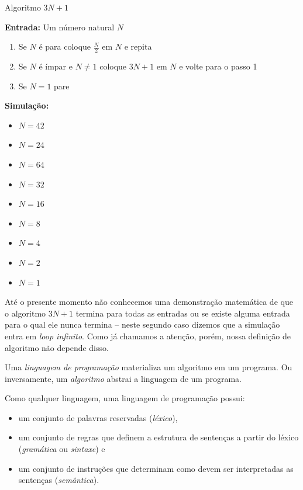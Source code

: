 \begin{example}{Algoritmo $3N+1$}
  \label{ex:euclides}

  \noindent
  {\bf Entrada:} Um número natural $N$
  \begin{enumerate}
  \item Se $N$ é para coloque $\frac{N}{2}$ em $N$ e repita
  \item Se $N$ é ímpar e $N \neq 1$ coloque $3N+1$ em $N$ e volte para o passo 1
  \item Se $N = 1$ pare
  \end{enumerate}

  \noindent
  {\bf Simulação:}
  \begin{itemize}
  \item $N = 42$
  \item $N = 24$
  \item $N = 64$
  \item $N = 32$
  \item $N = 16$
  \item $N = 8$
  \item $N = 4$
  \item $N = 2$
  \item $N = 1$
  \end{itemize}
\end{example}

Até o presente momento não conhecemos uma demonstração matemática de que o algoritmo $3N+1$ termina para todas as entradas ou se existe alguma entrada para o qual ele nunca termina -- neste segundo caso dizemos que a simulação entra em {\em loop infinito}.
Como já chamamos a atenção, porém, nossa definição de algoritmo não depende disso.

Uma {\em linguagem de programação} materializa um algoritmo em um programa.
Ou inversamente, um {\em algoritmo} abstrai a linguagem de um programa.

\begin{center}
\end{center}

Como qualquer linguagem, uma linguagem de programação possui:
\begin{itemize}
\item um conjunto de palavras reservadas ({\em léxico}), 
\item um conjunto de regras que definem a estrutura de sentenças a partir do léxico ({\em gramática} ou {\em sintaxe}) e
\item um conjunto de instruções que determinam como devem ser interpretadas as sentenças ({\em semântica}).
\end{itemize}

